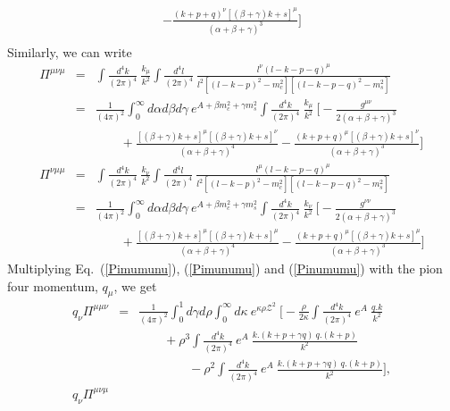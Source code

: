 \documentclass[twoside]{article}
\begin{document}
\begin{appendix}
\begin{eqnarray}
- \frac{(k+p+q)^\nu [(\beta+\gamma)k+s]^\mu}{(\alpha+\beta+\gamma)^3}
\Big] \nonumber\\
\end{eqnarray}
Similarly, we can write
\begin{eqnarray}
\label{Pimunumu}
\Pi^{\mu \nu \mu}
&=&
\int \frac{d^4 k}{(2 \pi)^4}~ \frac{k_\mu}{k^2} 
\int \frac{d^4 l}{(2 \pi)^4}~
\frac{l^\nu (l - k - p - q)^\mu}{l^2 \left[ (l-k-p)^2 - m_c^2 \right] \left[ (l - k - p - q)^2 - m_s^2  \right]} \nonumber\\ 
&=&
\frac{1}{(4 \pi)^2} \int_0^\infty d \alpha d \beta d \gamma~ e^{A+\beta m_c^2 + \gamma m_s^2}
\int \frac{d^4 k}{(2 \pi)^4}~ \frac{k_\mu}{k^2} ~
\Big[
- \frac{g^{\mu \nu}}{2(\alpha+\beta+\gamma)^3} \nonumber\\ && \qquad
+ \frac{\left[ (\beta+\gamma)k + s \right]^\mu \left[ (\beta+\gamma)k+s \right]^\nu}{(\alpha+\beta+\gamma)^4}
- \frac{(k+p+q)^\mu [(\beta+\gamma)k+s]^\nu}{(\alpha+\beta+\gamma)^3}
\Big] \\
\label{Pinumumu}
\Pi^{\nu \mu \mu}
&=&
\int \frac{d^4 k}{(2 \pi)^4}~ \frac{k_\nu}{k^2}
\int \frac{d^4 l}{(2 \pi)^4}~
\frac{l^\mu (l - k - p - q)^\mu}{l^2 \left[ (l-k-p)^2 - m_c^2 \right] \left[ (l - k - p - q)^2 - m_s^2  \right]} \nonumber\\ 
&=&
\frac{1}{(4 \pi)^2} \int_0^\infty d \alpha d \beta d \gamma~ e^{A+\beta m_c^2 + \gamma m_s^2}
\int \frac{d^4 k}{(2 \pi)^4}~ \frac{k_\nu}{k^2} ~
\Big[
- \frac{g^{\nu \nu}}{2(\alpha+\beta+\gamma)^3} \nonumber\\ && \qquad
+ \frac{\left[ (\beta+\gamma)k + s \right]^\mu \left[ (\beta+\gamma)k+s \right]^\mu}{(\alpha+\beta+\gamma)^4}
- \frac{(k+p+q)^\mu [(\beta+\gamma)k+s]^\mu}{(\alpha+\beta+\gamma)^3}
\Big] 
\end{eqnarray}
Multiplying Eq.~(\ref{Pimumunu}), (\ref{Pimunumu}) and (\ref{Pinumumu}) with the pion four momentum, $q_\mu$, we get
\begin{eqnarray}
\label{qPimumunu}
q_\nu \Pi^{\mu \mu \nu}
&=&
\frac{1}{(4 \pi)^2} \int_0^1 d \gamma d \rho \int_0^\infty d \kappa~ e^{\kappa \rho {\mathcal{Z}}^2}~\Big[
- \frac{\rho}{2 \kappa} \int \frac{d^4 k}{(2 \pi)^4}~e^A~ \frac{q.k}{k^2} \nonumber\\&&
\qquad
+ \rho^3 \int \frac{d^4 k}{(2 \pi)^4}~e^A~ \frac{k.(k+p+\gamma q)~q.(k+p)}{k^2} \nonumber\\&& \qquad \qquad
-\rho^2 \int \frac{d^4 k}{(2 \pi)^4}~e^A~\frac{k.(k+p+ \gamma q)~q.(k+p)}{k^2}
\Big], \\
\label{qPimunumu}
q_\nu \Pi^{\mu \nu \mu}

\end{eqnarray}
\end{appendix}
\end{document}
